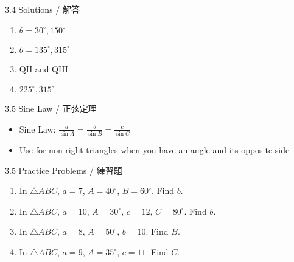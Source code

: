 \documentclass[aspectratio=169]{beamer}
\begin{document}
\begin{frame}{3.4 Solutions / 解答}
    \begin{tcolorbox}[colback=lightgray,colframe=accent,title=Solutions]
        \footnotesize
        \begin{enumerate}
            \item $\theta = 30^\circ, 150^\circ$
            \item $\theta = 135^\circ, 315^\circ$
            \item QII and QIII
            \item $225^\circ, 315^\circ$
        \end{enumerate}
    \end{tcolorbox}
\end{frame}

\begin{frame}{3.5 Sine Law / 正弦定理}
    \begin{tcolorbox}[colback=lightgray,colframe=primary,title=Key Points]
        \footnotesize
        \begin{itemize}
            \item Sine Law: $\frac{a}{\sin A} = \frac{b}{\sin B} = \frac{c}{\sin C}$
            \item Use for non-right triangles when you have an angle and its opposite side
        \end{itemize}
    \end{tcolorbox}
    \vspace{0.5em}
    \begin{center}
    \end{center}
\end{frame}

\begin{frame}{3.5 Practice Problems / 練習題}
    \begin{tcolorbox}[colback=lightgray,colframe=accent,title=Practice]
        \footnotesize
        \begin{enumerate}
            \item In $\triangle ABC$, $a=7$, $A=40^\circ$, $B=60^\circ$. Find $b$.
            \item In $\triangle ABC$, $a=10$, $A=30^\circ$, $c=12$, $C=80^\circ$. Find $b$.
            \item In $\triangle ABC$, $a=8$, $A=50^\circ$, $b=10$. Find $B$.
            \item In $\triangle ABC$, $a=9$, $A=35^\circ$, $c=11$. Find $C$.
        \end{enumerate}
    \end{tcolorbox}
\end{frame}
\end{document}

